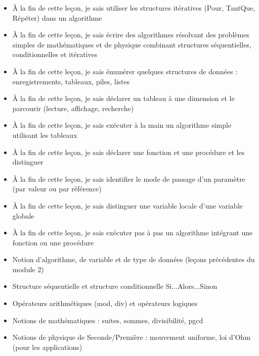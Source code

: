 \documentclass[11pt]{article}
\begin{document}
\begin{objectifs}
\begin{itemize}
\item À la fin de cette leçon, je sais utiliser les structures itératives (Pour, TantQue, Répéter) dans un algorithme
\item À la fin de cette leçon, je sais écrire des algorithmes résolvant des problèmes simples de mathématiques et de physique combinant structures séquentielles, conditionnelles et itératives
\item À la fin de cette leçon, je sais énumérer quelques structures de données : enregistrements, tableaux, piles, listes
\item À la fin de cette leçon, je sais déclarer un tableau à une dimension et le parcourir (lecture, affichage, recherche)
\item À la fin de cette leçon, je sais exécuter à la main un algorithme simple utilisant les tableaux
\item À la fin de cette leçon, je sais déclarer une fonction et une procédure et les distinguer
\item À la fin de cette leçon, je sais identifier le mode de passage d'un paramètre (par valeur ou par référence)
\item À la fin de cette leçon, je sais distinguer une variable locale d'une variable globale
\item À la fin de cette leçon, je sais exécuter pas à pas un algorithme intégrant une fonction ou une procédure
\end{itemize}
\end{objectifs}

\begin{prerequis}
\begin{itemize}
\item Notion d'algorithme, de variable et de type de données (leçons précédentes du module 2)
\item Structure séquentielle et structure conditionnelle Si...Alors...Sinon
\item Opérateurs arithmétiques (mod, div) et opérateurs logiques
\item Notions de mathématiques : suites, sommes, divisibilité, pgcd
\item Notions de physique de Seconde/Première : mouvement uniforme, loi d'Ohm (pour les applications)
\end{itemize}
\end{prerequis}

\newpage
\end{document}
